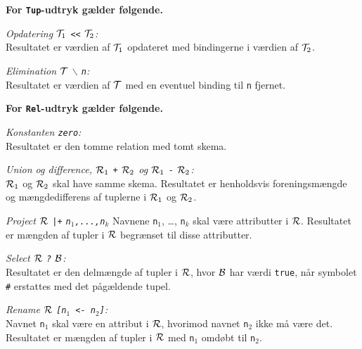 

{\bf For \verb"Tup"-udtryk g\ae{}lder f\o{}lgende.}

{\em Opdatering ${\cal T}_1$ \verb"<<" ${\cal T}_2$:}\\
Resultatet er v\ae{}rdien af ${\cal T}_1$ opdateret med
bindingerne i v\ae{}rdien af ${\cal T}_2$.

{\em Elimination $\cal T$ $\backslash$ \verb"n":}\\
Resultatet er v\ae{}rdien af $\cal T$ med en eventuel binding
til \verb"n" fjernet.

{\bf For \verb"Rel"-udtryk g\ae{}lder f\o{}lgende.}

{\em Konstanten \verb"zero":}\\
Resultatet er den tomme relation med tomt skema.

{\em Union og difference, ${\cal R}_1$ \verb"+" ${\cal R}_2$ og
${\cal R}_1$ \verb"-" ${\cal R}_2$:}\\
${\cal R}_1$ og ${\cal R}_2$ skal have samme skema. Resultatet er
henholdsvis foreningsm\ae{}ngde og m\ae{}ngdedifferens af tuplerne
i ${\cal R}_1$ og ${\cal R}_2$.

{\em Project $\cal R$ \verb"|+" \verb"n"$_1$\verb",...,n"$_k$}
Navnene \verb"n"$_1$, \ldots, \verb"n"$_k$ skal v\ae{}re attributter
i $\cal R$. Resultatet er m\ae{}ngden af tupler i $\cal R$ begr\ae{}nset
til disse attributter.

{\em Select $\cal R$ \verb"?" $\cal B$:}\\
Resultatet er den delm\ae{}ngde af tupler i $\cal R$, hvor
$\cal B$ har v\ae{}rdi \verb"true", n\aa{}r symbolet \verb"#" erstattes
med det p\aa{}g\ae{}ldende tupel.

{\em Rename $\cal R$ \verb"[n"$_1$\verb" <- n"$_2$\verb"]":}\\
Navnet \verb"n"$_1$ skal v\ae{}re en attribut i $\cal R$, hvorimod
navnet \verb"n"$_2$ ikke m\aa{} v\ae{}re det. Resultatet er
m\ae{}ngden af tupler i $\cal R$ med \verb"n"$_1$ omd\o{}bt
til \verb"n"$_2$.

